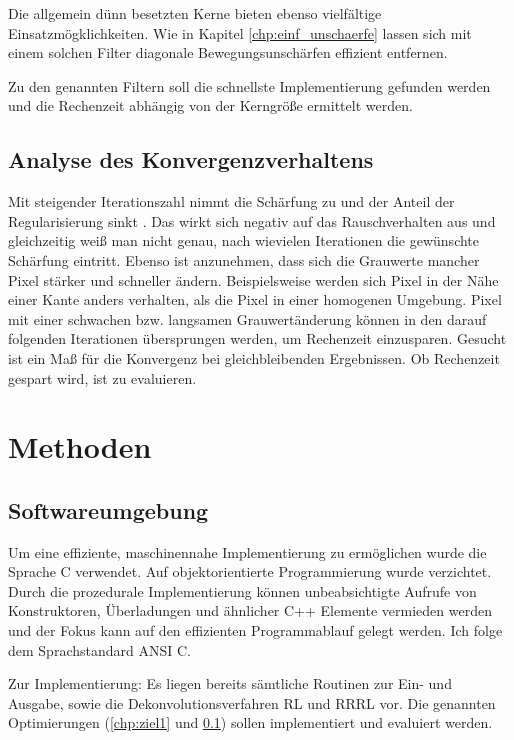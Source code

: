 \documentclass[a4paper,12pt]{article}
\begin{document}
Die allgemein dünn besetzten Kerne bieten ebenso vielfältige
Einsatzmögklichkeiten. Wie in Kapitel \ref{chp:einf_unschaerfe} lassen sich mit
einem solchen Filter diagonale Bewegungsunschärfen effizient entfernen.

Zu den genannten Filtern soll die schnellste Implementierung gefunden werden und
die Rechenzeit abhängig von der Kerngröße ermittelt werden.


\subsection{Analyse des Konvergenzverhaltens} \label{chp:ziel2}
Mit steigender Iterations\-zahl nimmt die Schärfung zu und der Anteil
der Regularisierung sinkt \cite{rrrl}. Das wirkt sich negativ auf das
Rauschverhalten aus und gleichzeitig weiß man nicht genau, nach wievielen
Iterationen die gewünschte Schärfung eintritt. Ebenso ist anzunehmen,
dass sich die Grauwerte mancher Pixel stärker und schneller ändern.
Beispiels\-weise werden sich Pixel in der Nähe einer Kante anders verhalten, als
die Pixel in einer homogenen Umgebung. Pixel mit einer schwachen bzw. langsamen Grauwertänderung können in den darauf
folgenden Iterationen übersprungen werden, um Rechenzeit ein\-zusparen.
Gesucht ist ein Maß für die Konvergenz bei gleichbleibenden Ergebnissen.
Ob Rechenzeit gespart wird, ist zu evaluieren.


 
\newpage
 
\section{Methoden}
\subsection{Softwareumgebung}
Um eine effiziente, maschinennahe Implementierung zu ermöglichen wurde die
Sprache C verwendet. Auf objektorientierte Programmierung wurde verzichtet.
Durch die prozedurale Implementierung können unbeabsichtigte Aufrufe von
Konstruktoren, Überladungen und ähnlicher C++ Elemente vermieden werden und der
Fokus kann auf den effizienten Programmablauf gelegt werden. Ich folge dem
Sprachstandard ANSI C.

Zur Implementierung: Es liegen bereits sämtliche Routinen zur Ein- und
Ausgabe, sowie die Dekonvolutionsverfahren RL und RRRL vor. 
Die genannten Optimierungen (\ref{chp:ziel1} und \ref{chp:ziel2}) sollen implementiert
und evaluiert werden.
\end{document}
